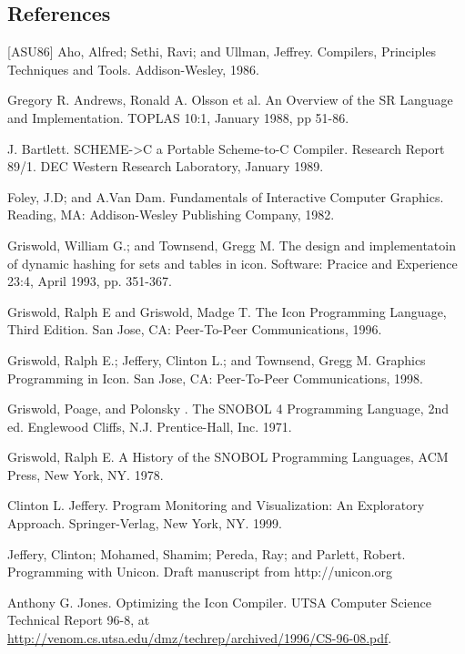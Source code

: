 \begin{noIndex}
\clearpage\section*{References}

[ASU86] Aho, Alfred; Sethi, Ravi; and Ullman, Jeffrey. Compilers,
Principles Techniques and Tools. Addison-Wesley, 1986.

\noindent
[Andrews88] Gregory R. Andrews, Ronald A. Olsson et al. An Overview of the SR
Language and Implementation. TOPLAS 10:1, January 1988, pp 51-86.

\noindent
[Bartlett 89] J. Bartlett. SCHEME-{\textgreater}C a Portable
Scheme-to-C Compiler. Research Report 89/1. DEC Western Research
Laboratory, January 1989.

\noindent
[Foley82] Foley, J.D; and A.Van Dam. Fundamentals of Interactive
Computer Graphics. Reading, MA: Addison-Wesley Publishing Company,
1982.

\noindent
[Griswold93] Griswold, William G.; and Townsend, Gregg M.
The design and implementatoin of dynamic hashing for sets
and tables in icon. Software: Pracice and Experience 23:4,
April 1993, pp. 351-367.

\noindent
[Griswold96] Griswold, Ralph E and Griswold, Madge T. The Icon
Programming Language, Third Edition. San Jose, CA: Peer-To-Peer
Communications, 1996.

\noindent
[Griswold98] Griswold, Ralph E.; Jeffery, Clinton L.; and Townsend,
Gregg M. Graphics Programming in Icon. San Jose, CA: Peer-To-Peer
Communications, 1998.

\noindent
[Griswold71] Griswold, Poage, and Polonsky . The SNOBOL 4 Programming
Language, 2nd ed. Englewood Cliffs, N.J.  Prentice-Hall, Inc. 1971.

\noindent
[Griswold78] Griswold, Ralph E. A History of the SNOBOL Programming
Languages, ACM Press, New York, NY. 1978.

\noindent
[Jeffery99] Clinton L. Jeffery. Program Monitoring and Visualization:
An Exploratory Approach.  Springer-Verlag, New York, NY. 1999.

\noindent
[Jeffery04] Jeffery, Clinton; Mohamed, Shamim; Pereda, Ray; and
Parlett, Robert. Programming with Unicon. Draft manuscript from
http://unicon.org

\noindent
[Jones96] Anthony G. Jones. Optimizing the Icon Compiler. UTSA
Computer Science Technical Report 96-8, at
\url{http://venom.cs.utsa.edu/dmz/techrep/archived/1996/CS-96-08.pdf}.


\end{noIndex}
